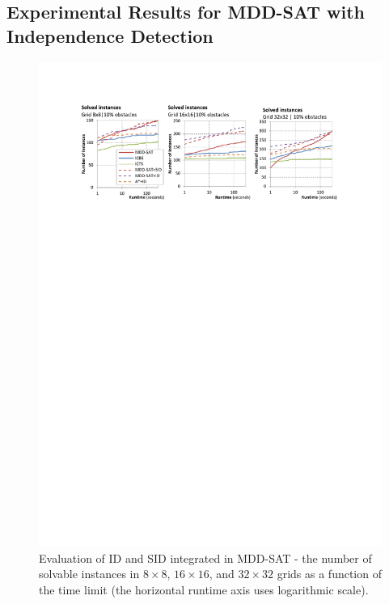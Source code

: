 \documentclass[jair,oneside,11pt]{article}
\begin{document}
\subsection{Experimental Results for MDD-SAT with Independence Detection}

\begin{figure}[h]
\centering
\includegraphics[trim={2.5cm 21.0cm 2.5cm 2.5cm},clip,width=\textwidth]{expr-id_grids-num-solved.pdf}
\vspace{-0.4cm}
\caption{Evaluation of ID and SID integrated in MDD-SAT - the number of solvable instances in $8{}\times{}8$, $16{}\times{}16$, and $32{}\times{}32$ grids as a function of the time limit (the horizontal runtime axis uses logarithmic scale).}
\label{expr-id_grids-num-solved}
\end{figure}
\end{document}
